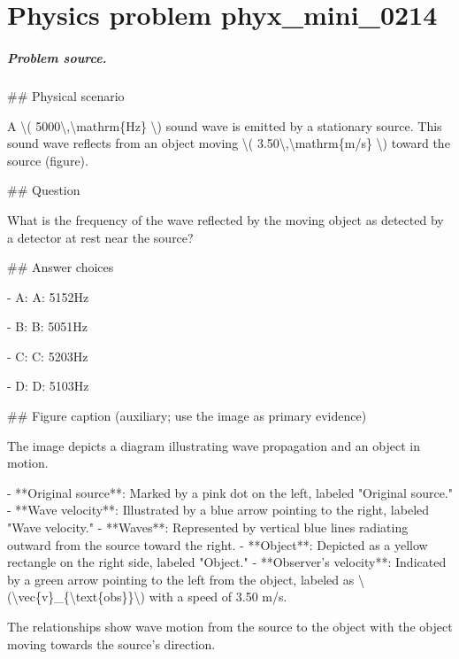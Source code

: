 
\chapter{Physics problem phyx\_mini\_0214}
\label{ch:PhyXMiniProblems_problem_phyx_mini_0214}

\paragraph{Problem source.}
\#\# Physical scenario

A \textbackslash{}( 5000\textbackslash{},\textbackslash{}mathrm\{Hz\} \textbackslash{}) sound wave is emitted by a stationary source. This sound wave reflects from an object moving \textbackslash{}( 3.50\textbackslash{},\textbackslash{}mathrm\{m/s\} \textbackslash{}) toward the source (figure).

\#\# Question

What is the frequency of the wave reflected by the moving object as detected by a detector at rest near the source?

\#\# Answer choices

- A: A: 5152Hz

- B: B: 5051Hz

- C: C: 5203Hz

- D: D: 5103Hz

\#\# Figure caption (auxiliary; use the image as primary evidence)

The image depicts a diagram illustrating wave propagation and an object in motion. 

- **Original source**: Marked by a pink dot on the left, labeled "Original source."
- **Wave velocity**: Illustrated by a blue arrow pointing to the right, labeled "Wave velocity."
- **Waves**: Represented by vertical blue lines radiating outward from the source toward the right.
- **Object**: Depicted as a yellow rectangle on the right side, labeled "Object."
- **Observer's velocity**: Indicated by a green arrow pointing to the left from the object, labeled as \textbackslash{}(\textbackslash{}vec\{v\}\_\{\textbackslash{}text\{obs\}\}\textbackslash{}) with a speed of 3.50 m/s.

The relationships show wave motion from the source to the object with the object moving towards the source's direction.

